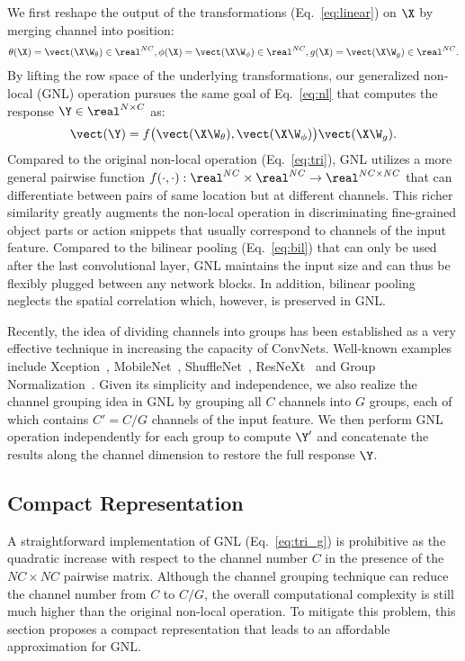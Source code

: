 \documentclass{article}
\begin{document}
We first reshape the output of the transformations (Eq.~\ref{eq:linear}) on $\X$ by merging channel into position:
\begin{align}
  \label{eq:linear_g}
  \theta(\X) = \vect(\X \W_\theta) \in \real^{NC}, \phi(\X) = \vect(\X \W_\phi) \in \real^{NC}, g(\X) = \vect(\X \W_g) \in \real^{NC} .
\end{align}
By lifting the row space of the underlying transformations, our generalized non-local (GNL) operation pursues the same goal of Eq.~\ref{eq:nl} that computes the response $\Y \in \real^{N \times C}$ as:
\begin{align}
  \label{eq:tri_g}
  \vect(\Y) = f \big( \vect(\X \W_\theta), \vect(\X \W_\phi) \big) \vect(\X \W_g).
\end{align}
Compared to the original non-local operation (Eq.~\ref{eq:tri}), GNL utilizes a more general pairwise function $f(\cdot, \cdot): \real^{NC} \times \real^{NC} \rightarrow \real^{NC \times NC}$ that can differentiate between pairs of same location but at different channels.
This richer similarity greatly augments the non-local operation in discriminating fine-grained object parts or action snippets that usually correspond to channels of the input feature.
Compared to the bilinear pooling (Eq.~\ref{eq:bil}) that can only be used after the last convolutional layer, GNL maintains the input size and can thus be flexibly plugged between any network blocks.
In addition, bilinear pooling neglects the spatial correlation which, however, is preserved in GNL.

Recently, the idea of dividing channels into groups has been established as a very effective technique in increasing the capacity of ConvNets.
Well-known examples include Xception~\cite{xception}, MobileNet~\cite{mobilenet}, ShuffleNet~\cite{shufflenet}, ResNeXt~\cite{resnext} and Group Normalization~\cite{gn}.
Given its simplicity and independence, we also realize the channel grouping idea in GNL by grouping all $C$ channels into $G$ groups, each of which contains $C'=C/G$ channels of the input feature.
We then perform GNL operation independently for each group to compute $\Y'$ and concatenate the results along the channel dimension to restore the full response $\Y$.
%
%
\subsection{Compact Representation}
\label{subsect:compact represnetation}
A straightforward implementation of GNL (Eq.~\ref{eq:tri_g}) is prohibitive as the quadratic increase with respect to the channel number $C$ in the presence of the $NC \times NC$ pairwise matrix.
Although the channel grouping technique can reduce the channel number from $C$ to $C/G$, the overall computational complexity is still much higher than the original non-local operation.
To mitigate this problem, this section proposes a compact representation that leads to an affordable approximation for GNL.
\end{document}
